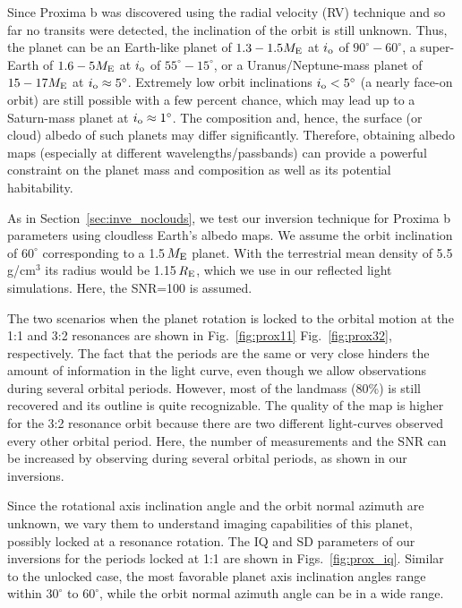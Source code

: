 \documentclass{emulateapj}
\begin{document}
Since Proxima b was discovered using the radial velocity (RV) technique
and so far no transits were detected, the inclination of the orbit is still
unknown. Thus, the planet can be 
an Earth-like planet of $1.3-1.5 M_{\rm E}$ at $i_{\rm o}$ of $90^\circ-60^\circ$, 
a super-Earth of $1.6-5 M_{\rm E}$ at $i_{\rm o}$ of $55^\circ-15^\circ$,
or a Uranus/Neptune-mass planet of $15-17 M_{\rm E}$ at $i_{\rm o}\approx5^\circ$.
Extremely low orbit inclinations $i_{\rm o}<5^\circ$
(a nearly face-on orbit) are still possible with a few percent chance, which
may lead up to a Saturn-mass planet at $i_{\rm o}\approx1^\circ$. 
The composition and, hence, the surface (or cloud) albedo of such planets may differ 
significantly. Therefore, obtaining albedo maps (especially at different wavelengths/passbands)
can provide a powerful constraint on the planet mass and composition as well as
its potential habitability. 

As in Section~\ref{sec:inve_noclouds}, we test our inversion technique for Proxima b parameters
using cloudless Earth's albedo maps. We assume the orbit inclination
of $60^\circ$ corresponding to a 1.5\,$M_{\rm E}$ planet. With the terrestrial mean density 
of 5.5\,g/cm$^3$ its radius would be 1.15\,$R_{\rm E}$, which we use in our reflected light 
simulations. Here, the SNR=100 is assumed. 

The two scenarios when the planet rotation is 
locked to the orbital motion at the 1:1 and 3:2 resonances are shown in Fig.~\ref{fig:prox11} 
Fig.~\ref{fig:prox32}, respectively.
The fact that the periods are the same or very close hinders the amount of information
in the light curve, even though we allow observations during several orbital periods.
However, most of the landmass (80\%) is still recovered and its outline
is quite recognizable. The quality of the map is higher for the 3:2 resonance orbit
because there are two different light-curves observed every other orbital period.
Here, the number of measurements and the SNR can be increased by  
observing during several orbital periods, as shown in our inversions.

Since the rotational axis inclination angle and the orbit normal azimuth
are unknown, we vary them to understand imaging capabilities of this planet,
possibly locked at a resonance rotation.
The IQ and SD parameters of our inversions for the periods locked at 1:1 are shown in
Figs.~\ref{fig:prox_iq}. Similar to the unlocked case, the most favorable planet axis inclination
angles range within $30^\circ$ to $60^\circ$, while the orbit normal azimuth angle
can be in a wide range.
\end{document}
